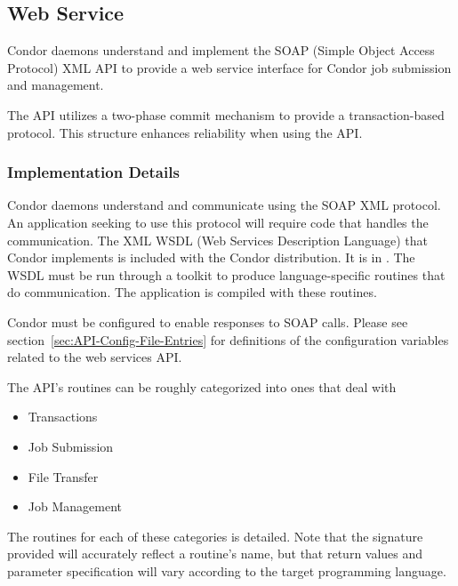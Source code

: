 \subsection{\label{API-WebService} Web Service}

Condor daemons understand and implement
the SOAP (Simple Object Access Protocol) XML API
to provide a web service interface for Condor job submission
and management.

The API utilizes a two-phase commit mechanism to provide
a transaction-based protocol.  
This structure enhances reliability when using the API.

\subsubsection{\label{WebService-Implementation} Implementation Details}

Condor daemons understand and communicate using the
SOAP XML protocol.
An application seeking to use this protocol
will require code that handles the communication.
The XML WSDL (Web Services Description Language)
that Condor implements is included with the
Condor distribution.
It is in .
The WSDL must be run through a toolkit to produce
language-specific routines that do communication.
The application is compiled with these routines.

Condor must be configured to enable responses to SOAP calls.
Please see 
section~\ref{sec:API-Config-File-Entries} for definitions of the
configuration variables related to the web services API.

The API's routines can be roughly categorized into ones that
deal with
\begin{itemize}
  \item Transactions
  \item Job Submission
  \item File Transfer
  \item Job Management
\end{itemize}
The routines for each of these categories is detailed.
Note that the signature provided will accurately 
reflect a routine's name, 
but that return values and parameter specification
will vary according  to the target programming language.

